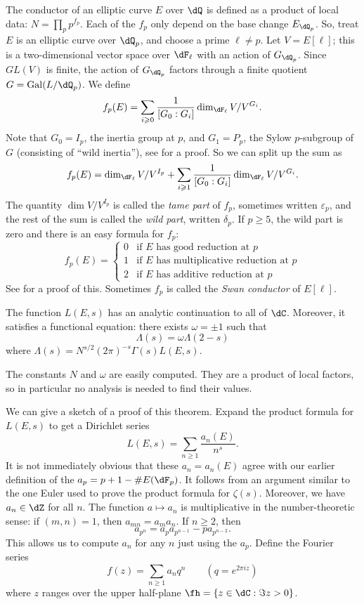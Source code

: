 The conductor of an elliptic curve $E$ over $\dQ$ is defined as a product of 
local data: $N = \prod_p p^{f_p}$. Each of the $f_p$ only depend on the base 
change $E_{\dQ_p}$. So, treat $E$ is an elliptic curve over $\dQ_p$, and 
choose a prime $\ell\ne p$. Let $V=E[\ell]$; this is a two-dimensional vector 
space over $\dF_\ell$ with an action of $G_{\dQ_p}$. Since $GL(V)$ is finite, 
the action of $G_{\dQ_p}$ factors through a finite quotient 
$G=\gal(L/\dQ_p)$. We define 
\[
  f_p(E) = \sum_{i\geqslant 0} \frac{1}{[G_0:G_i]} \dim_{\dF_\ell} V/V^{G_i} \text{.}
\]
Note that $G_0=I_p$, the inertia group at $p$, and $G_1=P_p$, the Sylow 
$p$-subgroup of $G$ (consisting of ``wild inertia''), see \cite[IV]{se79} for a 
proof. So we can split up the sum as 
\[
  f_p(E) = \dim_{\dF_\ell} V/V^{I_p} + \sum_{i\geqslant 1} \frac{1}{[G_0:G_i]} \dim_{\dF_\ell} V/V^{G_i} \text{.}
\]
The quantity $\dim V/V^{I_p}$ is called the \emph{tame part} of $f_p$, 
sometimes written $\varepsilon_p$, and the 
rest of the sum is called the \emph{wild part}, written $\delta_p$. If 
$p\geqslant 5$, the wild part is zero and there is an easy formula for $f_p$: 
\[
  f_p(E) 
    = \begin{cases}
        0 & \text{if $E$ has good reduction at $p$} \\
        1 & \text{if $E$ has multiplicative reduction at $p$} \\
        2 & \text{if $E$ has additive reduction at $p$} 
      \end{cases}
\]
See \cite[IV.10.2]{si94} for a proof of this. Sometimes $f_p$ is called the 
\emph{Swan conductor} of $E[\ell]$. 

\begin{theorem}\label{thm:L-cont}
The function $L(E,s)$ has an analytic continuation to all of $\dC$. Moreover, 
it satisfies a functional equation: there exists $\omega =\pm 1$ such that 
\[
  \Lambda(s) = \omega \Lambda(2-s)
\]
where $\Lambda(s) = N^{s/2} (2\pi)^{-s} \Gamma(s) L(E,s)$. 
\end{theorem}

The constants $N$ and $\omega$ are easily computed. They are a product of 
local factors, so in particular no analysis is needed to find their values. 

We can give a sketch of a proof of this theorem. Expand the product formula for 
$L(E,s)$ to get a Dirichlet series 
\[
  L(E,s) = \sum_{n\geqslant 1} \frac{a_n(E)}{n^s} \text{.}
\]
It is not immediately obvious that these $a_n=a_n(E)$ agree with our earlier 
definition of the $a_p=p+1-\# E(\dF_p)$. It follows from an argument similar to 
the one Euler used to prove the product formula for $\zeta(s)$. Moreover, we 
have $a_n\in \dZ$ for all $n$. The function 
$a\mapsto a_n$ is multiplicative in the number-theoretic sense: if 
$(m,n)=1$, then $a_{mn}=a_m a_n$. If $n\geqslant 2$, then 
\[
  a_{p^n} = a_p a_{p^{n-1}} - p a_{p^{n-2}} \text{.}
\]
This allows us to compute $a_n$ for any $n$ just using the $a_p$. Define the 
Fourier series 
\[
  f(z) = \sum_{n\geqslant 1} a_n q^n \qquad (q=e^{2\pi i z})
\]
where $z$ ranges over the upper half-plane $\fh=\{z\in \dC:\Im z>0\}$. 

